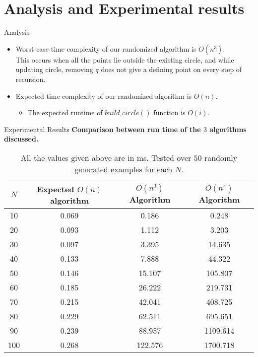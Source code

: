 \documentclass{beamer}
\begin{document}
\section{Analysis and Experimental results}

\begin{frame}{Analysis}
\begin{itemize}
    \item Worst case time complexity of our randomized algorithm is $O(n^3)$.\\ 
    \pause 
    This occurs when all the points lie outside the existing circle, and while updating circle, removing $q$ does not give a defining point on every step of recursion.
    \pause
    \item Expected time complexity of our randomized algorithm is $O(n)$.
    \pause
    \begin{itemize}
        \item The expected runtime of $build\_circle()$ function is $O(i)$.
    \end{itemize}
\end{itemize}
\end{frame}

\begin{frame}{Experimental Results}
\textbf{Comparison between run time of the $3$ algorithms discussed.}
\begin{table}
\centering
\begin{tabular}{|c| c |c |c|} 
 \hline\hline
 $N$ & Expected $O(n)$ algorithm & $O(n^3)$ Algorithm & $O(n^4)$ Algorithm \\ [0.5ex] 
 \hline\hline
10 & 0.069 & 0.186 & 0.248 \\ \hline
20 & 0.093 & 1.112 & 3.203 \\ \hline
30 & 0.097 & 3.395 & 14.635 \\ \hline
40 & 0.133 & 7.888 & 44.322 \\ \hline
50 & 0.146 & 15.107 & 105.807 \\ \hline
60 & 0.185 & 26.222 & 219.731 \\ \hline
70 & 0.215 & 42.041 & 408.725 \\ \hline
80 & 0.229 & 62.511 & 695.651\\ \hline
90 & 0.239 & 88.957 & 1109.614 \\ \hline
100 & 0.268 & 122.576 & 1700.718\\ \hline
\end{tabular}
\caption{All the values given above are in ms. Tested over $50$ randomly generated examples for each $N$.}
\label{Talbe}
\end{table}
\end{frame}
\end{document}
